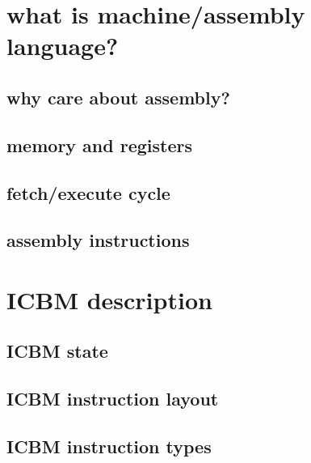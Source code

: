 
\begin{frame}
    \titlepage
\end{frame}

\section{what is machine/assembly language?}



\subsection{why care about assembly?}



\subsection{memory and registers}

\subsection{fetch/execute cycle}

\subsection{assembly instructions}


\section{ICBM description}


\subsection{ICBM state}


\subsection{ICBM instruction layout}

\subsection{ICBM instruction types}

